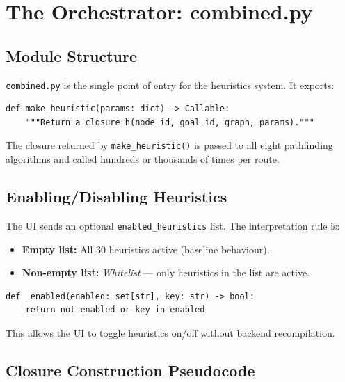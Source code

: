 \documentclass[12pt,a4paper]{article}
\begin{document}
\newpage

\section{The Orchestrator: combined.py}

\subsection{Module Structure}

\texttt{combined.py} is the single point of entry for the heuristics system. It exports:

\begin{lstlisting}
def make_heuristic(params: dict) -> Callable:
    """Return a closure h(node_id, goal_id, graph, params)."""
\end{lstlisting}

The closure returned by \texttt{make\_heuristic()} is passed to all eight pathfinding algorithms and called hundreds or thousands of times per route.

\subsection{Enabling/Disabling Heuristics}

The UI sends an optional \texttt{enabled\_heuristics} list. The interpretation rule is:

\begin{itemize}
  \item \textbf{Empty list:} All 30 heuristics active (baseline behaviour).
  \item \textbf{Non-empty list:} \textit{Whitelist} --- only heuristics in the list are active.
\end{itemize}

\begin{lstlisting}
def _enabled(enabled: set[str], key: str) -> bool:
    return not enabled or key in enabled
\end{lstlisting}

This allows the UI to toggle heuristics on/off without backend recompilation.

\subsection{Closure Construction Pseudocode}
\end{document}
